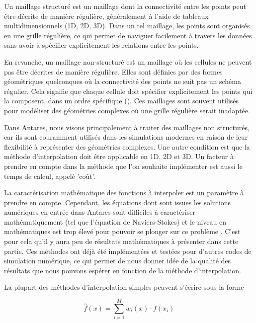 Un maillage structuré est un maillage dont la connectivité\label{connectivité} entre les points peut être décrite de manière régulière, généralement à l'aide de tableaux multidimensionnels (1D, 2D, 3D). Dans un tel maillage, les points sont organisés en une grille régulière, ce qui permet de naviguer facilement à travers les données sans avoir à spécifier explicitement les relations entre les points.

En revanche, un maillage non-structuré est un maillage où les cellules ne peuvent pas être décrites de manière régulière. Elles sont définies par des formes géométriques quelconques où la connectivité des points ne suit pas un schéma régulier. Cela signifie que chaque cellule doit spécifier explicitement les points qui la composent, dans un ordre spécifique (). Ces maillages sont souvent utilisés pour modéliser des géométries complexes où une grille régulière serait inadaptée.

Dans Antares, nous visons principalement à traiter des maillages non structurés, car ils sont couramment utilisés dans les simulations modernes en raison de leur flexibilité à représenter des géométries complexes. Une autre condition est que la méthode d'interpolation doit être applicable en 1D, 2D et 3D. Un facteur à prendre en compte dans la méthode que l'on souhaite implémenter est aussi le temps de calcul, appelé 'coût'.

La caractérisation mathématique des fonctions à interpoler est un paramètre à prendre en compte. Cependant, les équations dont sont issues les solutions numériques en entrée dans Antares sont difficiles à caractériser mathématiquement (tel que l'équation de Naviers-Stokes) et le niveau en mathématiques est trop élevé pour pouvoir se plonger sur ce problème \cite{gordont1971_2}. C'est pour cela qu'il y aura peu de résultats mathématiques à présenter dans cette partie.
Ces méthodes ont déjà été implémentées et testées pour d'autres codes de simulation numérique, ce qui permet de nous donner idée de la qualité des résultats que nous pouvons espérer en fonction de la méthode d'interpolation.

\newpage

La plupart des méthodes d'interpolation simples peuvent s'écrire sous la forme

\begin{equation}
    \hat{f}(x) = \sum_{i=1}^{M} w_i(x) \cdot f(x_i)
\end{equation}


